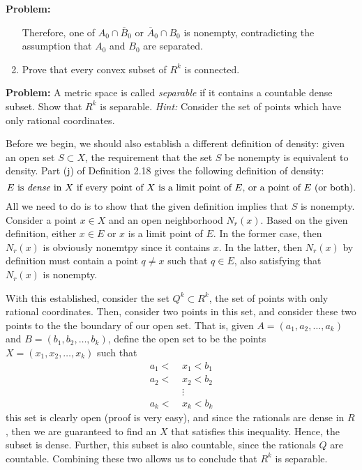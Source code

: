 \documentclass[10pt]{article}
\newenvironment{problem}{\textbf{Problem:}}{}
\begin{document}
\begin{problem}
\begin{enumerate}[label=\alph*)]
\begin{solution}
					Therefore, one of \( A_0 \cap \overline B_0 \) or \( \overline A_0 \cap B_0 \) is nonempty, 
					contradicting the assumption that \( A_0 \) and \( B_0 \) are separated. 
				\end{solution}
			\item Prove that every convex subset of \( R^{k} \) is connected. 

				\begin{solution}
				\end{solution}
		\end{enumerate}
	\end{problem}

	\begin{problem}
		A metric space is called \textit{separable} if it contains a countable dense subset. Show that \( R^{k} \) 
		is separable. \textit{Hint:} Consider the set of points which have only rational coordinates.  
	\end{problem}

	\begin{solution}
		Before we begin, we should also establish a different definition of density: given an open set \( S \subset 
		X\), the requirement that the set \( S \) be nonempty is equivalent to density. Part (j) of 
		Definition 2.18 gives the following definition of density:
		\[
			\text{\( E \) is \textit{dense} in \( X \) if every point of \( X \) is a limit point of \( E \), or 
			a point of \( E \) (or both).}
		\] 
		All we need to do is to show that the given definition implies that \( S \) is nonempty. Consider 
		a point \( x \in X \) and an open neighborhood \( N_r(x) \). Based on the given definition, either 
		\( x \in E\) or \( x \) is a limit point of \( E \). In the former case, then \( N_r(x) \) is obviously 
		nonemtpy since it contains \( x \). In the latter, then \( N_r(x) \) by definition must contain 
		a point \( q \neq x \) such that \( q \in E \), also satisfying that \( N_r(x) \) is nonempty. 

		With this established, consider the set \( Q^{k} \subset R^{k} \), the set of points with only rational 
		coordinates. Then, consider two points in this set, and consider these two points to the the boundary 
		of our open set. That is, given \( A = (a_1, a_2, \dots, a_k) \) and \( B = (b_1, b_2, \dots, b_k) \), 
		define the open set to be the points \( X = (x_1, x_2, \dots, x_k)  \) such that 
		\begin{align*}
			a_1 < \ &x_1 < b_1\\
			a_2 < \ &x_2 < b_2\\
				  &\vdots\\
			a_k < \ &x_k < b_k
		\end{align*}
		this set is clearly open (proof is very easy), and since the rationals are dense in \( R \), then we are 
		guaranteed to find an \( X \) that satisfies this inequality. Hence, the subset is dense. Further, this 
		subset is also countable, since the rationals \( Q \) are countable. Combining these two allows us 
		to conclude that \( R^{k} \) is separable. 
	\end{solution}
	
\end{document}
